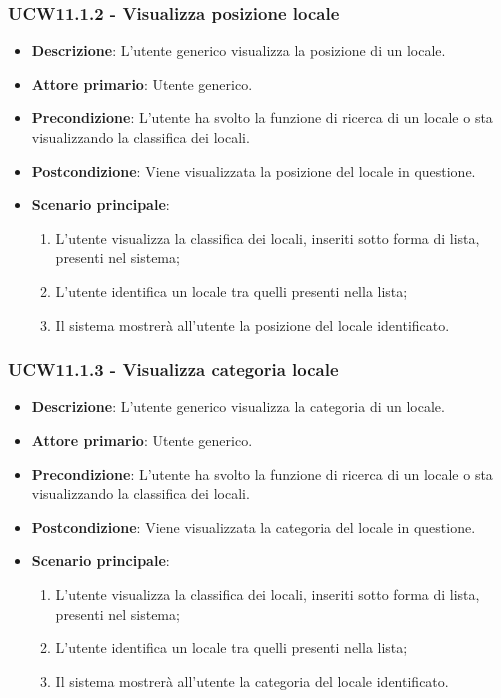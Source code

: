 \subsubsection{UCW11.1.2 - Visualizza posizione locale}
\begin{itemize}
    \item \textbf{Descrizione}: L'utente generico visualizza la posizione di un locale.
    \item \textbf{Attore primario}: Utente generico.
    \item \textbf{Precondizione}: L'utente ha svolto la funzione di ricerca di un locale o sta visualizzando la classifica dei locali.
    \item \textbf{Postcondizione}: Viene visualizzata la posizione del locale in questione.
    \item \textbf{Scenario principale}: 
    \begin{enumerate}
	\item L'utente visualizza la classifica dei locali, inseriti sotto forma di lista, presenti nel sistema;
    \item L'utente identifica un locale tra quelli presenti nella lista;
	\item Il sistema mostrerà all'utente la posizione del locale identificato.
    \end{enumerate}
\end{itemize}

\subsubsection{UCW11.1.3 - Visualizza categoria locale}
\begin{itemize}
    \item \textbf{Descrizione}: L'utente generico visualizza la categoria di un locale.
    \item \textbf{Attore primario}: Utente generico.
    \item \textbf{Precondizione}: L'utente ha svolto la funzione di ricerca di un locale o sta visualizzando la classifica dei locali.
    \item \textbf{Postcondizione}: Viene visualizzata la categoria del locale in questione.
    \item \textbf{Scenario principale}: 
    \begin{enumerate}
	\item L'utente visualizza la classifica dei locali, inseriti sotto forma di lista, presenti nel sistema;
	\item L'utente identifica un locale tra quelli presenti nella lista;
	\item Il sistema mostrerà all'utente la categoria del locale identificato.
    \end{enumerate}
\end{itemize}

